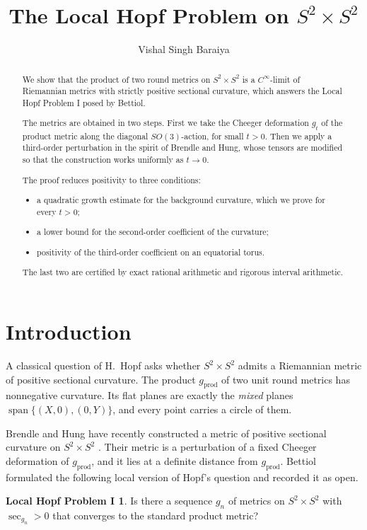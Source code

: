 \documentclass[11pt]{amsart}
\title{The Local Hopf Problem on \texorpdfstring{$S^2\times S^2$}{S2 x S2}}
\author{Vishal Singh Baraiya}
\theoremstyle{definition}
\newtheorem*{problem}{Local Hopf Problem I}
\theoremstyle{remark}
\newcommand{\sect}{\operatorname{sec}}
\newcommand{\gprod}{g_{\mathrm{prod}}}
\newcommand{\Span}{\operatorname{span}}
\begin{document}
\begin{abstract}
We show that the product of two round metrics on $S^2\times S^2$ is a $C^\infty$-limit of Riemannian metrics with strictly positive sectional curvature, which answers the Local Hopf Problem I posed by Bettiol.

The metrics are obtained in two steps. First we take the Cheeger deformation $g_t$ of the product metric along the diagonal $SO(3)$-action, for small $t>0$. Then we apply a third-order perturbation in the spirit of Brendle and Hung, whose tensors are modified so that the construction works uniformly as $t\to0$.

The proof reduces positivity to three conditions:
\begin{itemize}[leftmargin=*]
\item a quadratic growth estimate for the background curvature, which we prove for every $t>0$;
\item a lower bound for the second-order coefficient of the curvature;
\item positivity of the third-order coefficient on an equatorial torus.
\end{itemize}
The last two are certified by exact rational arithmetic and rigorous interval arithmetic.
\end{abstract}

\maketitle

\section{Introduction}

A classical question of H.~Hopf asks whether $S^2\times S^2$ admits a Riemannian metric of positive sectional curvature. The product $\gprod$ of two unit round metrics has nonnegative curvature. Its flat planes are exactly the \emph{mixed} planes $\Span\{(X,0),(0,Y)\}$, and every point carries a circle of them.

Brendle and Hung have recently constructed a metric of positive sectional curvature on $S^2\times S^2$ \cite{BH}. Their metric is a perturbation of a fixed Cheeger deformation of $\gprod$, and it lies at a definite distance from $\gprod$. Bettiol \cite[Introduction]{Be} formulated the following local version of Hopf's question and recorded it as open.

\begin{problem}
Is there a sequence $g_n$ of metrics on $S^2\times S^2$ with $\sect_{g_n}>0$ that converges to the standard product metric?
\end{problem}
\end{document}
